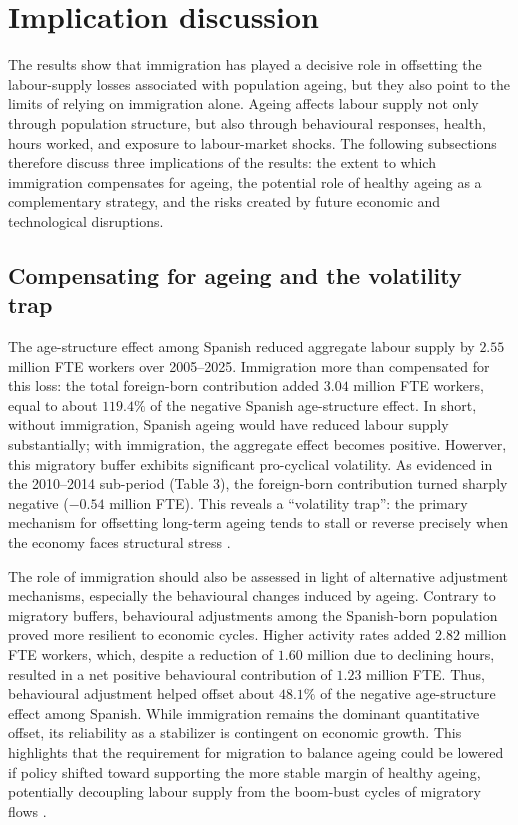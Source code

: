 \section{Implication discussion}

The results show that immigration has played a decisive role in offsetting the labour-supply losses associated with population ageing, but they also point to the limits of relying on immigration alone. Ageing affects labour supply not only through population structure, but also through behavioural responses, health, hours worked, and exposure to labour-market shocks. The following subsections therefore discuss three implications of the results: the extent to which immigration compensates for ageing, the potential role of healthy ageing as a complementary strategy, and the risks created by future economic and technological disruptions.


\subsection{Compensating for ageing and the volatility trap}


The age-structure effect among Spanish reduced aggregate labour supply by \(2.55\) million FTE workers over 2005--2025. Immigration more than compensated for this loss: the total foreign-born contribution added \(3.04\) million FTE workers, equal to about \(119.4\%\) of the negative Spanish age-structure effect. In short, without immigration, Spanish ageing would have reduced labour supply substantially; with immigration, the aggregate effect becomes positive. Howerver, this migratory buffer exhibits significant pro-cyclical volatility. As evidenced in the 2010--2014 sub-period (Table 3), the foreign-born contribution turned sharply negative (\(-0.54\) million FTE). This reveals a ``volatility trap'': the primary mechanism for offsetting long-term ageing tends to stall or reverse precisely when the economy faces structural stress \parencite{galvez2022cyclicality, funcas2024vulnerability}.

\vspace{0.7em}\par
The role of immigration should also be assessed in light of alternative adjustment mechanisms, especially the behavioural changes induced by ageing. Contrary to migratory buffers, behavioural adjustments among the Spanish-born population proved more resilient to economic cycles. Higher activity rates added \(2.82\) million FTE workers, which, despite a reduction of \(1.60\) million due to declining hours, resulted in a net positive behavioural contribution of \(1.23\) million FTE. Thus, behavioural adjustment helped offset about \(48.1\%\) of the negative age-structure effect among Spanish. While immigration remains the dominant quantitative offset, its reliability as a stabilizer is contingent on economic growth. This highlights that the requirement for migration to balance ageing could be lowered if policy shifted toward supporting the more stable margin of healthy ageing, potentially decoupling labour supply from the boom-bust cycles of migratory flows \parencite{cepr2025limits}.


